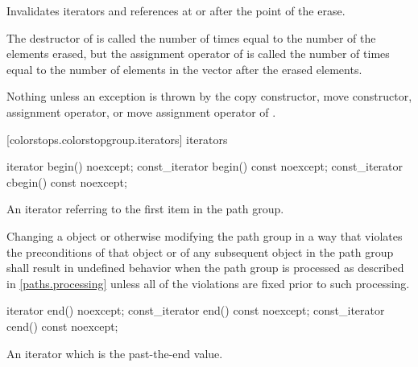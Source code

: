 \begin{itemdescr}
	\pnum
	\effects
	Invalidates iterators and references at or after the point of the erase.
	
	\pnum
	\complexity
	The destructor of  is called the number of times equal to 
	the number of the elements erased, but the assignment operator
	of  is called the number of times equal to the number of
	elements in the vector after the erased elements.
	
	\pnum
	\throws
	Nothing unless an exception is thrown by the copy constructor, move 
	constructor, assignment operator, or move assignment operator of
	.
\end{itemdescr}

 [colorstops.colorstopgroup.iterators] { iterators}

\begin{itemdecl}
	iterator begin() noexcept;
	const_iterator begin() const noexcept;
	const_iterator cbegin() const noexcept;
\end{itemdecl}
\begin{itemdescr}
	\pnum
	\returns
	An iterator referring to the first  item in the path group.
	
	\pnum
	\remarks
	Changing a  object or otherwise modifying the path group in a way that violates the preconditions of that  object or of any subsequent  object in the path group shall result in undefined behavior when the path group is processed as described in \ref{paths.processing} unless all of the violations are fixed prior to such processing.
\end{itemdescr}

\begin{itemdecl}
	iterator end() noexcept;
	const_iterator end() const noexcept;
	const_iterator cend() const noexcept;
\end{itemdecl}
\begin{itemdescr}
	\pnum
	\returns
	An iterator which is the past-the-end value.
\end{itemdescr}

